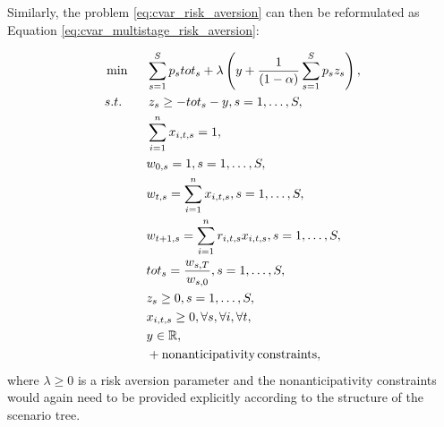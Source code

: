 Similarly, the problem \ref{eq:cvar_risk_aversion} can then be reformulated as Equation \ref{eq:cvar_multistage_risk_aversion}:

\begin{alignat}{10}
& \min  \, \, \, &&\sum_{s=1}^{S} p_s tot_s + \lambda \left( y + \frac{1}{(1-\alpha)} \sum_{s=1}^S p_s z_s \right), \label{eq:cvar_multistage_risk_aversion}  \\
&s.t. && \, z_s \geq  -tot_s -y, s=1,\dots,S, \nonumber \\
&  && \sum_{i=1}^{n} x_{i,t,s} = 1, \nonumber \\
& && w_{0,s}=1, s=1,\dots,S, \nonumber \\
& && w_{t,s}=\sum_{i=1}^{n} x_{i,t,s}, s=1,\dots,S, \label{eq:cvar_multistage_expected_return:wealth_distribution} \\
& && w_{t+1,s}=\sum_{i=1}^{n} r_{i,t,s} x_{i,t,s}, s=1,\dots,S, \label{eq:cvar_multistage_expected_return:wealth_increases} \\
& && tot_s = \frac{w_{s,T}}{w_{s,0}}, s=1,\dots,S, \nonumber \\
& && z_s \geq 0, s=1,\dots,S, \nonumber \\
& && x_{i,t,s} \geq 0, \forall s, \forall i, \forall t, \nonumber \\
& && y \in \R ,\nonumber \\
& && + \mathrm{nonanticipativity \, constraints}, \nonumber
\end{alignat}
where $\lambda \geq 0$ is a risk aversion parameter and the nonanticipativity constraints would again need to be provided explicitly according to the structure of the scenario tree.